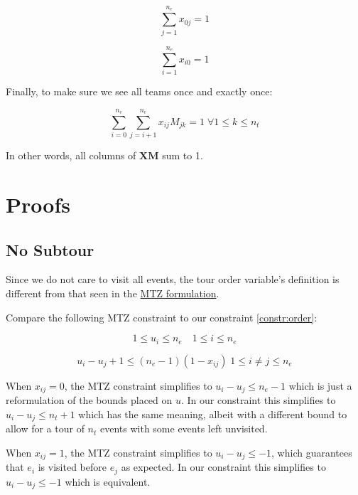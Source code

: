 \documentclass[11pt]{article}
\begin{document}
\begin{equation} \label{constr:start_out_edge}
    \sum_{j=1}^{n_e} x_{0j} = 1
\end{equation}

\begin{equation} \label{constr:end}
    \sum_{i=1}^{n_e} x_{i0} = 1
\end{equation}

Finally, to make sure we see all teams once and exactly once:

\begin{equation} \label{constr:teams}
    \sum_{i=0}^{n_e} \sum_{j=i + 1}^{n_e} x_{ij}M_{jk}  = 1 \; \forall 1 \leq k \leq n_t
\end{equation}

In other words, all columns of $\mathbf{X} \mathbf{M}$ sum to 1.

\section{Proofs}
\subsection{No Subtour}
Since we do not care to visit all events, the tour order variable's definition is different from that seen in the \href{https://en.wikipedia.org/wiki/Travelling_salesman_problem#Miller%E2%80%93Tucker%E2%80%93Zemlin_formulation}{MTZ formulation}.

Compare the following MTZ constraint to our constraint \eqref{constr:order}:

\begin{equation} \label{constr:mtz_u}
    1 \leq u_i \leq n_e \quad 1 \leq i \leq n_e
\end{equation}

\begin{equation} \label{constr:mtz}
    u_i - u_j + 1 \leq (n_e - 1)(1 - x_{ij}) \; 1 \leq i \neq j \leq n_e
\end{equation}

When $x_{ij} = 0$, the MTZ constraint simplifies to $u_i - u_j \leq n_e - 1$ which is just a reformulation of the bounds placed on $u$. In our constraint this simplifies to $u_i - u_j \leq n_t + 1$ which has the same meaning, albeit with a different bound to allow for a tour of $n_t$ events with some events left unvisited.

When $x_{ij} = 1$, the MTZ constraint simplifies to $u_i - u_j \leq -1$, which guarantees that $e_i$ is visited before $e_j$ as expected. In our constraint this simplifies to $u_i - u_j \leq -1$ which is equivalent.
\end{document}
